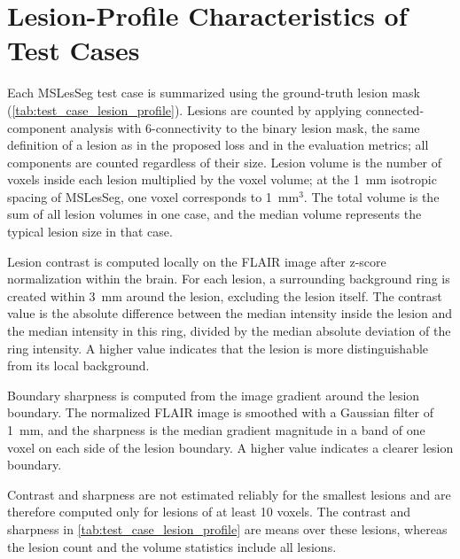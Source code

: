 \section{Lesion-Profile Characteristics of Test Cases}
\label{appendix:test-case-lesion-profile}

Each MSLesSeg test case is summarized using the ground-truth lesion mask
(\cref{tab:test_case_lesion_profile}). Lesions are counted by applying
connected-component analysis with 6-connectivity to the binary lesion
mask, the same definition of a lesion as in the proposed loss and in the
evaluation metrics; all components are counted regardless of their size.
Lesion volume is the number of voxels inside each lesion multiplied by the
voxel volume; at the 1~mm isotropic spacing of MSLesSeg, one voxel
corresponds to 1~mm$^3$. The total volume is the sum of all lesion volumes
in one case, and the median volume represents the typical lesion size in
that case.

Lesion contrast is computed locally on the FLAIR image after z-score
normalization within the brain. For each lesion, a surrounding background
ring is created within 3~mm around the lesion, excluding the lesion itself.
The contrast value is the absolute difference between the median intensity
inside the lesion and the median intensity in this ring, divided by the
median absolute deviation of the ring intensity. A higher value indicates
that the lesion is more distinguishable from its local background.

Boundary sharpness is computed from the image gradient around the lesion
boundary. The normalized FLAIR image is smoothed with a Gaussian filter of
1~mm, and the sharpness is the median gradient magnitude in a band of one
voxel on each side of the lesion boundary. A higher value indicates a
clearer lesion boundary.

Contrast and sharpness are not estimated reliably for the smallest lesions
and are therefore computed only for lesions of at least 10 voxels. The
contrast and sharpness in \cref{tab:test_case_lesion_profile} are means
over these lesions, whereas the lesion count and the volume statistics
include all lesions.

